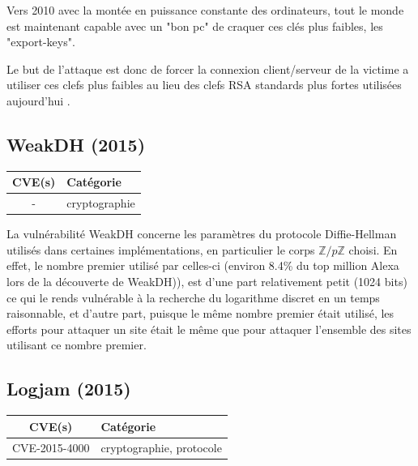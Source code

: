 Vers 2010 avec la montée en puissance constante des ordinateurs, tout le monde est maintenant capable avec un "bon pc" de craquer ces clés plus faibles, les "export-keys".

Le but de l'attaque est donc de forcer la connexion client/serveur de la victime a utiliser ces clefs plus faibles au lieu des clefs RSA standards plus fortes utilisées aujourd'hui \cite{freak}.




\subsection{WeakDH (2015)}

\begin{tabularx}{0.96\textwidth}{|c|X|}
  \hline
  \textbf{CVE(s)} & \textbf{Catégorie} \\
  \hline
  - & cryptographie \\
  \hline
\end{tabularx}

\vspace{1em}

La vulnérabilité WeakDH concerne les paramètres du protocole Diffie-Hellman utilisés dans certaines implémentations, en particulier le corps $\mathbb{Z}/p\mathbb{Z}$ choisi. En effet, le nombre premier utilisé par celles-ci (environ 8.4\% du top million Alexa lors de la découverte de WeakDH)), est d'une part relativement petit (1024 bits) ce qui le rends vulnérable à la recherche du logarithme discret en un temps raisonnable, et d'autre part, puisque le même nombre premier était utilisé, les efforts pour attaquer un site était le même que pour attaquer l'ensemble des sites utilisant ce nombre premier\cite{weakdh}.




\subsection{Logjam (2015)}

\begin{tabularx}{0.96\textwidth}{|c|X|}
  \hline
  \textbf{CVE(s)} & \textbf{Catégorie} \\
  \hline
  CVE-2015-4000 & cryptographie, protocole \\
  \hline
\end{tabularx}

